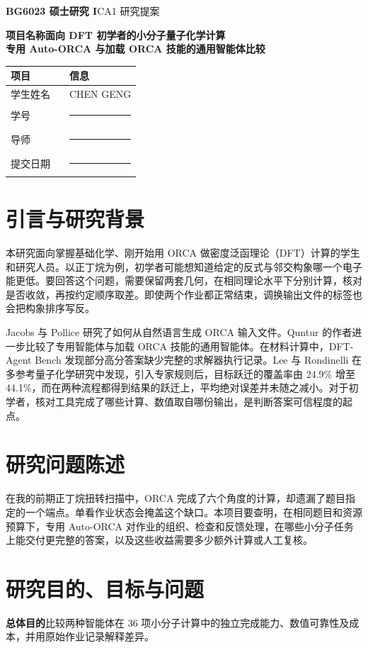 \documentclass[12pt,a4paper]{article}
\newcommand{\blankfield}{\rule{3.5cm}{0.35pt}}
\newcommand{\StudentName}{CHEN GENG}
\newcommand{\StudentID}{\blankfield}
\newcommand{\Supervisor}{\blankfield}
\newcommand{\SubmissionDate}{\blankfield} %
\begin{document}
\textbf{BG6023 硕士研究 I}\hfill CA1 研究提案\par
\textbf{项目名称\quad 面向 DFT 初学者的小分子量子化学计算}\\
\textbf{专用 Auto-ORCA 与加载 ORCA 技能的通用智能体比较}\par
\begin{tabularx}{\linewidth}{|P{0.45\linewidth}|Y|}
\hline
{}\textbf{项目} & \textbf{信息} \\ \hline
学生姓名 & \StudentName \\ \hline
学号 & \StudentID \\ \hline
导师 & \Supervisor \\ \hline
提交日期 & \SubmissionDate \\ \hline
\end{tabularx}

\section{引言与研究背景}
本研究面向掌握基础化学、刚开始用 ORCA 做密度泛函理论（DFT）计算的学生和研究人员。以正丁烷为例，初学者可能想知道给定的反式与邻交构象哪一个电子能更低。要回答这个问题，需要保留两套几何，在相同理论水平下分别计算，核对是否收敛，再按约定顺序取差。即使两个作业都正常结束，调换输出文件的标签也会把构象排序写反。

Jacobs 与 Pollice 研究了如何从自然语言生成 ORCA 输入文件\cite{jacobs}。Quntur 的作者进一步比较了专用智能体与加载 ORCA 技能的通用智能体\cite{quntur}。在材料计算中，DFT-Agent Bench 发现部分高分答案缺少完整的求解器执行记录\cite{dftbench}。Lee 与 Rondinelli 在多参考量子化学研究中发现，引入专家规则后，目标跃迁的覆盖率由 24.9\% 增至 44.1\%，而在两种流程都得到结果的跃迁上，平均绝对误差并未随之减小\cite{lee}。对于初学者，核对工具完成了哪些计算、数值取自哪份输出，是判断答案可信程度的起点。

\section{研究问题陈述}
在我的前期正丁烷扭转扫描中，ORCA 完成了六个角度的计算，却遗漏了题目指定的一个端点。单看作业状态会掩盖这个缺口。本项目要查明，在相同题目和资源预算下，专用 Auto-ORCA 对作业的组织、检查和反馈处理，在哪些小分子任务上能交付更完整的答案，以及这些收益需要多少额外计算或人工复核。

\section{研究目的、目标与问题}
\textbf{总体目的}\quad 比较两种智能体在 36 项小分子计算中的独立完成能力、数值可靠性及成本，并用原始作业记录解释差异。
\end{document}
